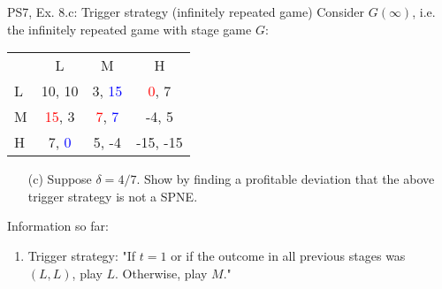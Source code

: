 \begin{frame}{PS7, Ex. 8.c: Trigger strategy (infinitely repeated game)}
    Consider $G(\infty)$, i.e. the infinitely repeated game with stage game $G$: \vspace{-6pt}
    \begin{table}
      \begin{tabular}{l|c|c|c|}
        \multicolumn{1}{c}{} & \multicolumn{1}{c}{L} & \multicolumn{1}{c}{M} & \multicolumn{1}{c}{H} \\\cline{2-4}
        L & 10, 10 & 3, \textcolor{blue}{15} & \textcolor{red}{0}, 7 \\\cline{2-4}
        M & \textcolor{red}{15}, 3 & \textcolor{red}{7}, \textcolor{blue}{7} & -4, 5 \\\cline{2-4}
        H & 7, \textcolor{blue}{0} & 5, -4 & -15, -15 \\\cline{2-4}
      \end{tabular}
    \end{table}
    \begin{itemize}
      \vspace{-4pt} \item[(c)] Suppose $\delta = 4/7$. Show by finding a profitable deviation that the above trigger strategy is not a SPNE. \vspace{-6pt}
    \end{itemize}
  \begin{multicols}{2}
    \vfill\null\columnbreak
    Information so far:
    \begin{enumerate}
      \item Trigger strategy: "If $t=1$ or if the outcome in all previous stages was $(L,L)$, play $L$. Otherwise, play $M$."
    \end{enumerate}
    \vfill\null
  \end{multicols}
\end{frame}
